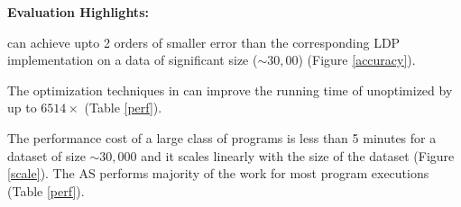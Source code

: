 \textbf{Evaluation Highlights:}
\squishlist \item \system can achieve upto 2 orders of smaller error than the corresponding
\textsf{LDP} implementation on a data of significant size ($\sim 30,00$) (Figure \ref{accuracy}).
\item The optimization techniques in \system can improve the running time
of unoptimized \system by up to $6514\times$ (Table \ref{perf}).
\item The performance cost of a large class of \system programs is
less than 5 minutes for a dataset of size $\sim 30,000$  and it scales linearly with the size of the dataset (Figure \ref{scale}). The \textsf{AS} performs majority of the work for most program executions (Table \ref{perf}).
\squishend
